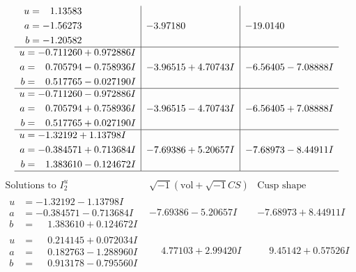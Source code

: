 \documentclass[1p]{elsarticle_modified}
\theoremstyle{definition}
\newcommand{\I}{\sqrt{-1}}
\begin{document}
$$\begin{array}{c|c|c}
\begin{aligned}
u &= \phantom{-}1.13583\phantom{ +0.000000I} \\
a &= -1.56273\phantom{ +0.000000I} \\
b &= -1.20582\phantom{ +0.000000I}\end{aligned}
 & -3.97180\phantom{ +0.000000I} & -19.0140\phantom{ +0.000000I} \\ \hline\begin{aligned}
u &= -0.711260 + 0.972886 I \\
a &= \phantom{-}0.705794 - 0.758936 I \\
b &= \phantom{-}0.517765 - 0.027190 I\end{aligned}
 & -3.96515 + 4.70743 I & -6.56405 - 7.08888 I \\ \hline\begin{aligned}
u &= -0.711260 - 0.972886 I \\
a &= \phantom{-}0.705794 + 0.758936 I \\
b &= \phantom{-}0.517765 + 0.027190 I\end{aligned}
 & -3.96515 - 4.70743 I & -6.56405 + 7.08888 I \\ \hline\begin{aligned}
u &= -1.32192 + 1.13798 I \\
a &= -0.384571 + 0.713684 I \\
b &= \phantom{-}1.383610 - 0.124672 I\end{aligned}
 & -7.69386 + 5.20657 I & -7.68973 - 8.44911 I\\
 \hline 
 \end{array}$$\newpage$$\begin{array}{c|c|c}  
\text{Solutions to }I^u_{2}& \I (\text{vol} + \sqrt{-1}CS) & \text{Cusp shape}\\
 \hline 
\begin{aligned}
u &= -1.32192 - 1.13798 I \\
a &= -0.384571 - 0.713684 I \\
b &= \phantom{-}1.383610 + 0.124672 I\end{aligned}
 & -7.69386 - 5.20657 I & -7.68973 + 8.44911 I \\ \hline\begin{aligned}
u &= \phantom{-}0.214145 + 0.072034 I \\
a &= \phantom{-}0.182763 - 1.288960 I \\
b &= \phantom{-}0.913178 - 0.795560 I\end{aligned}
 & \phantom{-}4.77103 + 2.99420 I & \phantom{-}9.45142 + 0.57526 I \\ \hline\begin{aligned}

\end{aligned}
\end{array}$$
\end{document}
